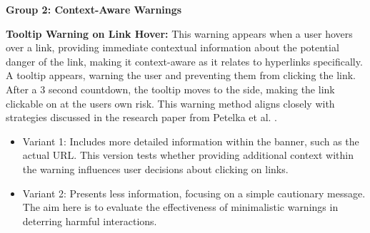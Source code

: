 \documentclass[
  a4paper,  %
  twoside,  %
  bibliography=totoc,
  headsepline,
  cleardoublepage=empty,
  parskip=half,
  draft=false
]{scrbook}
\begin{document}
\textbf{Group 2: Context-Aware Warnings}

\textbf{Tooltip Warning on Link Hover:} This warning appears when a user hovers over a link, providing immediate contextual information about the potential danger of the link, making it context-aware as it relates to hyperlinks specifically. A tooltip appears, warning the user and preventing them from clicking the link. After a 3 second countdown, the tooltip moves to the side, making the link clickable on at the users own risk. This warning method aligns closely with strategies discussed in the research paper from Petelka et al. \cite{petelka}.

\begin{itemize}
    \item Variant 1: Includes more detailed information within the banner, such as the actual URL. This version tests whether providing additional context within the warning influences user decisions about clicking on links.
    \item Variant 2: Presents less information, focusing on a simple cautionary message. The aim here is to evaluate the effectiveness of minimalistic warnings in deterring harmful interactions.
\end{itemize}
\end{document}
